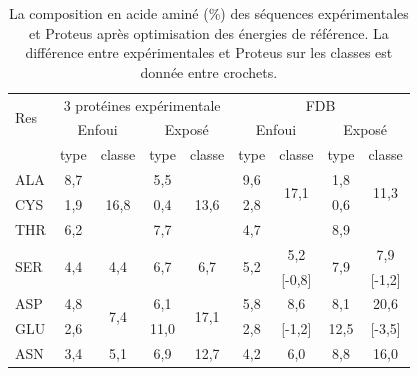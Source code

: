    \begin{table}[!htbp]
     \centering
\caption{La composition en acide aminé (\%) des séquences expérimentales et Proteus après optimisation des énergies de référence. La différence entre expérimentales et Proteus sur les classes est donnée entre crochets.}
\begin{tabular}{l|cccc|cccc}
\hline
\multirow{2}{*}{Res} & \multicolumn{4}{c|}{3 protéines expérimentale}s & \multicolumn{4}{c}{FDB}\\
 & \multicolumn{2}{c}{Enfoui} & \multicolumn{2}{c|}{Exposé} & \multicolumn{2}{c}{Enfoui} & \multicolumn{2}{c}{Exposé} \\
\hline
 & type & classe & type & classe & type & classe & type & classe \\
\hline 
ALA                  & 8,7                  &  \multirow{3}{*}{16,8} & 5,5                  & \multirow{3}{*}{13,6}   &   9,6                & \multirow{2}{*}{17,1}    & 1,8 & \multirow{2}{*}{11,3} \\
CYS                  & 1,9                  &                        & 0,4                  &                         &    2,8               & \multirow{2}{*}{[-0,3]}  & 0,6 & \multirow{2}{*}{[2,3]} \\
THR                  & 6,2                  &                        & 7,7                  &                         &    4,7               &                          & 8,9 &                       \\
\hline
\multirow{2}{*}{SER} & \multirow{2}{*}{4,4} & \multirow{2}{*}{4,4}   & \multirow{2}{*}{6,7} & \multirow{2}{*}{6,7}    & \multirow{2}{*}{5,2} & 5,2                      & \multirow{2}{*}{7,9} & 7,9\\
                     &                      &                        &                      &                         &                      &  [-0,8]                  &                      & [-1,2] \\
\hline
ASP                  & 4,8                  & \multirow{2}{*}{7,4}   & 6,1                  & \multirow{2}{*}{17,1}   &   5,8                &  8,6                     & 8,1    & 20,6  \\
GLU                  & 2,6                  &                        & 11,0                 &                         &   2,8                &  [-1,2]                  & 12,5   &  [-3,5] \\
\hline
ASN                  & 3,4                  & \multirow{2}{*}{5,1}   & 6,9                  & \multirow{2}{*}{12,7}   &   4,2                &  6,0                     & 8,8 & 16,0 \\

\end{tabular}
\end{table}
